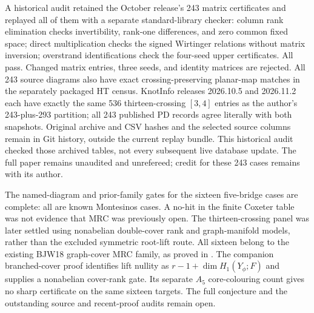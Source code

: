 \documentclass[11pt]{article}
\begin{document}
A historical audit retained the October release's 243 matrix certificates
and replayed all of them with a separate standard-library checker: column
rank elimination checks invertibility, rank-one differences, and zero
common fixed space; direct multiplication checks the signed Wirtinger
relations without matrix inversion; overstrand identifications check
the four-seed upper certificates. All pass. Changed matrix entries,
three seeds, and identity matrices are rejected. All 243 source diagrams
also have exact crossing-preserving planar-map matches in the separately
packaged HT census. KnotInfo releases 2026.10.5 and 2026.11.2 each have
exactly the same 536 thirteen-crossing $[3,4]$ entries as the author's
243-plus-293 partition; all 243 published PD records agree literally
with both snapshots. Original archive and CSV hashes and the selected
source columns remain in Git history, outside the current replay bundle.
This historical audit checked those archived tables, not
every subsequent live database update. The full paper remains unaudited
and unrefereed; credit for these 243 cases remains with its author.

The named-diagram and prior-family gates for the sixteen five-bridge
cases are complete: all are known Montesinos cases. A no-hit in the
finite Coxeter table was not evidence that MRC was previously open.
The thirteen-crossing panel was later settled using nonabelian double-cover
rank and graph-manifold models, rather than the excluded symmetric root-lift
route. All sixteen belong to the existing BJW18 graph-cover MRC family, as
proved in .
The companion branched-cover proof identifies lift nullity as
$r-1+\dim H_1(Y_\phi;F)$ and supplies a nonabelian cover-rank gate.
Its separate $A_5$ core-colouring count gives no sharp certificate on
the same sixteen targets. The full conjecture and the outstanding
source and recent-proof audits remain open.
\end{document}
